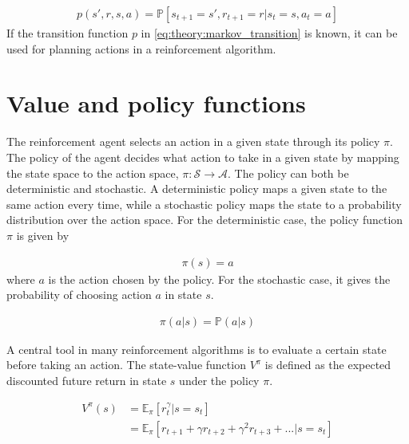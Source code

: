 \documentclass[class=book, crop=false, 11pt]{standalone}
\begin{document}
\begin{equation}
   \begin{aligned}\label{eq:theory:markov_transition}
    p(s',r,s,a) = \mathbb{P}
    [s_{t+1}=s',r_{t+1}=r | s_{t}=s, a_{t} = a]
\end{aligned} 
\end{equation}
If the transition function $p$ in \eqref{eq:theory:markov_transition} is known, it can be used for planning actions in a reinforcement algorithm. 





\section{Value and policy functions}
The reinforcement agent selects an action in a given state through its policy $\pi$. The policy of the agent decides what action to take in a given state by mapping the state space to the action space, $\pi: \mathcal{S} \to \mathcal{A}$. The policy can both be deterministic and stochastic. A deterministic policy maps a given state to the same action every time, while a stochastic policy maps the state to a probability distribution over the action space. For the deterministic case, the policy function $\pi$ is given by


\begin{equation}
   \begin{aligned}\label{eq:theory:policy_function_deterministic}
\pi(s) = a
\end{aligned} 
\end{equation}
where $a$ is the action chosen by the policy. For the stochastic case, it gives the probability of choosing action $a$ in state $s$.


\begin{equation}
   \begin{aligned}\label{eq:theory:policy_function_stochastic}
\pi(a|s) = \mathbb{P}(a|s)
\end{aligned} 
\end{equation}


A central tool in many reinforcement algorithms is to evaluate a certain state before taking an action. The state-value function $V^{\pi}$ is defined as the expected discounted future return in state $s$ under the policy $\pi$.

\begin{equation}
   \begin{aligned}\label{eq:theory:value_function}
V^{\pi}(s) 
&= \mathbb{E}_{\pi}[r^{\gamma}_{t}| s=s_{t}]
\\
&= \mathbb{E}_{\pi}[ r_{t+1} + \gamma r_{t+2} + \gamma^{2} r_{t+3} + ...|s=s_{t}]
\end{aligned} 
\end{equation}
\end{document}
